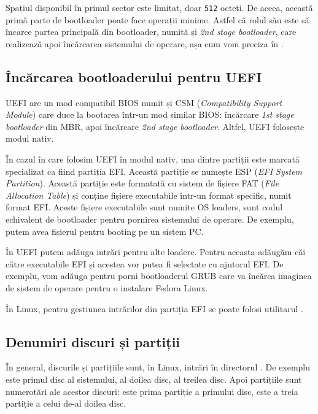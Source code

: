 Spațiul disponibil în primul sector este limitat, doar \texttt{512} octeți.
De aceea, această primă parte de bootloader poate face operații minime.
Astfel că rolul său este să încarce partea principală din bootloader, numită și \textit{2nd stage bootloader}, care realizează apoi încărcarea sistemului de operare, așa cum vom preciza în .

\subsection{Încărcarea bootloaderului pentru UEFI}
\label{sec:boot:bootdev:uefi}

UEFI are un mod compatibil BIOS numit și CSM  (\textit{Compatibility Support Module}) care duce la bootarea într-un mod similar BIOS: încărcare \textit{1st stage bootloader} din MBR, apoi încărcare \textit{2nd stage bootloader}.
 Altfel, UEFI folosește modul nativ.

În cazul în care folosim UEFI în modul nativ, una dintre partiții este marcată specializat ca fiind partiția EFI.
Această partiție se numește ESP (\textit{EFI System Partition}).
Această partiție este formatată cu sistem de fișiere FAT (\textit{File Allocation Table}) și conține fișiere executabile într-un format specific, numit format EFI.
Aceste fișiere executabile sunt numite OS loaders, sunt codul echivalent de bootloader pentru pornirea sistemului de operare.
De exemplu, putem avea fișierul  pentru booting pe un sistem PC.

În UEFI putem adăuga intrări pentru alte loadere.
Pentru aceasta adăugăm căi către executabile EFI și acestea vor putea fi selectate cu ajutorul EFI.
De exemplu, vom adăuga  pentru porni bootloaderul GRUB care va încărca imaginea de sistem de operare pentru o instalare Fedora Linux.

În Linux, pentru gestiunea intrărilor din partiția EFI se poate folosi utilitarul .

\subsection{Denumiri discuri și partiții}
\label{sec:boot:bootdev:naming}

În general, discurile și partițiile sunt, în Linux, intrări în directorul .
 De exemplu  este primul disc al sistemului,  al doilea disc,  al treilea disc.
Apoi partițiile sunt numerotări ale acestor discuri:  este prima partiție a primului disc,  este a treia partiție a celui de-al doilea disc.


